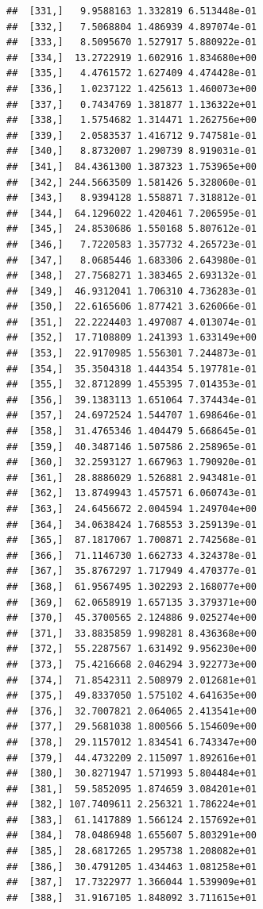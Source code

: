 \documentclass[article]{jss}\usepackage[]{graphicx}\usepackage[]{xcolor}
\makeatletter
\newenvironment{kframe}{%
 \def\at@end@of@kframe{}%
 \ifinner\ifhmode%
  \def\at@end@of@kframe{\end{minipage}}%
  \begin{minipage}{\columnwidth}%
 \fi\fi%
 \def\FrameCommand##1{\hskip\@totalleftmargin \hskip-\fboxsep
 \colorbox{shadecolor}{##1}\hskip-\fboxsep
     \hskip-\linewidth \hskip-\@totalleftmargin \hskip\columnwidth}%
 \MakeFramed {\advance\hsize-\width
   \@totalleftmargin\z@ \linewidth\hsize
   \@setminipage}}%
 {\par\unskip\endMakeFramed%
 \at@end@of@kframe}
\newenvironment{knitrout}{}{} %
\makeatother
\begin{document}
\begin{knitrout}
\begin{kframe}
\begin{verbatim}
##  [331,]   9.9588163 1.332819 6.513448e-01
##  [332,]   7.5068804 1.486939 4.897074e-01
##  [333,]   8.5095670 1.527917 5.880922e-01
##  [334,]  13.2722919 1.602916 1.834680e+00
##  [335,]   4.4761572 1.627409 4.474428e-01
##  [336,]   1.0237122 1.425613 1.460073e+00
##  [337,]   0.7434769 1.381877 1.136322e+01
##  [338,]   1.5754682 1.314471 1.262756e+00
##  [339,]   2.0583537 1.416712 9.747581e-01
##  [340,]   8.8732007 1.290739 8.919031e-01
##  [341,]  84.4361300 1.387323 1.753965e+00
##  [342,] 244.5663509 1.581426 5.328060e-01
##  [343,]   8.9394128 1.558871 7.318812e-01
##  [344,]  64.1296022 1.420461 7.206595e-01
##  [345,]  24.8530686 1.550168 5.807612e-01
##  [346,]   7.7220583 1.357732 4.265723e-01
##  [347,]   8.0685446 1.683306 2.643980e-01
##  [348,]  27.7568271 1.383465 2.693132e-01
##  [349,]  46.9312041 1.706310 4.736283e-01
##  [350,]  22.6165606 1.877421 3.626066e-01
##  [351,]  22.2224403 1.497087 4.013074e-01
##  [352,]  17.7108809 1.241393 1.633149e+00
##  [353,]  22.9170985 1.556301 7.244873e-01
##  [354,]  35.3504318 1.444354 5.197781e-01
##  [355,]  32.8712899 1.455395 7.014353e-01
##  [356,]  39.1383113 1.651064 7.374434e-01
##  [357,]  24.6972524 1.544707 1.698646e-01
##  [358,]  31.4765346 1.404479 5.668645e-01
##  [359,]  40.3487146 1.507586 2.258965e-01
##  [360,]  32.2593127 1.667963 1.790920e-01
##  [361,]  28.8886029 1.526881 2.943481e-01
##  [362,]  13.8749943 1.457571 6.060743e-01
##  [363,]  24.6456672 2.004594 1.249704e+00
##  [364,]  34.0638424 1.768553 3.259139e-01
##  [365,]  87.1817067 1.700871 2.742568e-01
##  [366,]  71.1146730 1.662733 4.324378e-01
##  [367,]  35.8767297 1.717949 4.470377e-01
##  [368,]  61.9567495 1.302293 2.168077e+00
##  [369,]  62.0658919 1.657135 3.379371e+00
##  [370,]  45.3700565 2.124886 9.025274e+00
##  [371,]  33.8835859 1.998281 8.436368e+00
##  [372,]  55.2287567 1.631492 9.956230e+00
##  [373,]  75.4216668 2.046294 3.922773e+00
##  [374,]  71.8542311 2.508979 2.012681e+01
##  [375,]  49.8337050 1.575102 4.641635e+00
##  [376,]  32.7007821 2.064065 2.413541e+00
##  [377,]  29.5681038 1.800566 5.154609e+00
##  [378,]  29.1157012 1.834541 6.743347e+00
##  [379,]  44.4732209 2.115097 1.892616e+01
##  [380,]  30.8271947 1.571993 5.804484e+01
##  [381,]  59.5852095 1.874659 3.084201e+01
##  [382,] 107.7409611 2.256321 1.786224e+01
##  [383,]  61.1417889 1.566124 2.157692e+01
##  [384,]  78.0486948 1.655607 5.803291e+00
##  [385,]  28.6817265 1.295738 1.208082e+01
##  [386,]  30.4791205 1.434463 1.081258e+01
##  [387,]  17.7322977 1.366044 1.539909e+01
##  [388,]  31.9167105 1.848092 3.711615e+01

\end{verbatim}
\end{kframe}
\end{knitrout}
\end{document}
